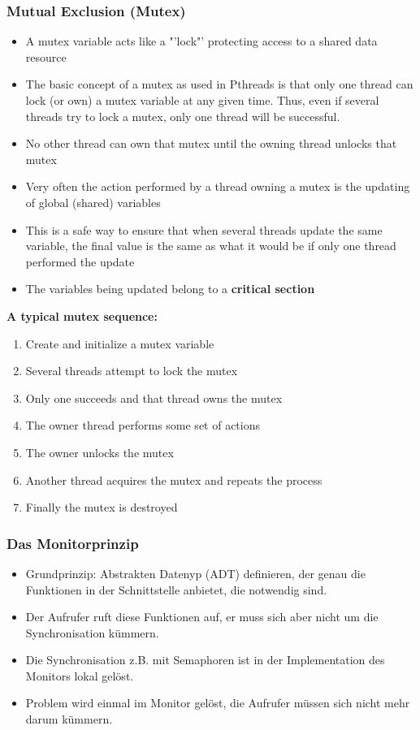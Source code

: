 \subsubsection{Mutual Exclusion (Mutex)}
\begin{itemize}
  \item A mutex variable acts like a "'lock"' protecting access to a shared data resource
  \item The basic concept of a mutex as used in Pthreads is that only one thread can lock (or own) a mutex variable at any given time. Thus, even if several threads try to lock a mutex, only one thread will be successful.
  \item No other thread can own that mutex until the owning thread unlocks that mutex
  \item Very often the action performed by a thread owning a mutex is the updating of global (shared) variables
  \item This is a safe way to ensure that when several threads update the same variable, the final value is the same as what it would be if only one thread performed the update
  \item The variables being updated belong to a \textbf{critical section}
\end{itemize}
\textbf{A typical mutex sequence:}
\begin{enumerate}
  \item Create and initialize a mutex variable
  \item Several threads attempt to lock the mutex
  \item Only one succeeds and that thread owns the mutex
  \item The owner thread performs some set of actions
  \item The owner unlocks the mutex
  \item Another thread acquires the mutex and repeats the process
  \item Finally the mutex is destroyed
\end{enumerate}



 \subsubsection{Das Monitorprinzip}
 \begin{itemize}
   \item Grundprinzip: Abstrakten Datenyp (ADT) definieren, der genau die Funktionen
   in der Schnittstelle anbietet, die notwendig sind.
   \item Der Aufrufer ruft diese Funktionen auf, er muss sich aber nicht um die
   Synchronisation kümmern.
   \item Die Synchronisation z.B. mit Semaphoren ist in der Implementation des
   Monitors lokal gelöst.
   \item Problem wird einmal im Monitor gelöst, die Aufrufer müssen sich nicht
   mehr darum kümmern.
 \end{itemize}

